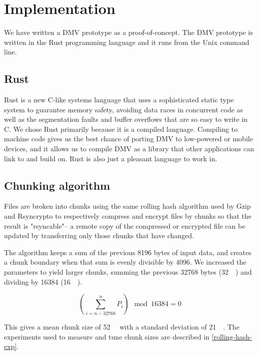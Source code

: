 \chapter{Implementation}

We have written a DMV prototype as a proof-of-concept. The DMV prototype is
written in the Rust programming language and it runs from the Unix command line.


\section{Rust}

Rust is a new C-like systems language that uses a sophisticated static type
system to guarantee memory safety, avoiding data races in concurrent code as
well as the segmentation faults and buffer overflows that are so easy to write
in C. We chose Rust primarily because it is a compiled language. Compiling to
machine code gives us the best chance of porting DMV to low-powered or mobile
devices, and it allows us to compile DMV as a library that other applications
can link to and build on. Rust is also just a pleasant language to work in.





\section{Chunking algorithm}

Files are broken into chunks using the same rolling hash algorithm used by Gzip
and Rsyncrypto\cite{rsyncrypto_algorithm} to respectively compress and encrypt
files by chunks so that the result is "rsyncable"-- a remote copy of the
compressed or encrypted file can be updated by transferring only those chunks
that have changed.

The algorithm keeps a sum of the previous \num{8196} bytes of input data, and
creates a chunk boundary when that sum is evenly divisible by \num{4096}. We
increased the parameters to yield larger chunks, summing the previous
\num{32768} bytes (\SI{32}{\kibi\byte}) and dividing by \num{16384}
(\SI{16}{\kibi\relax}).

\begin{equation*}
    \left( \sum_{i = n - \num{32768} }^{n}{P_i} \right) \mod \num{16384} = 0
\end{equation*}

This gives a mean chunk size of \SI{52}{\kibi\byte} with a standard deviation of
\SI{21}{\kibi\byte}. The experiments used to measure and tune chunk sizes are
described in \autoref{rolling-hash-exp}.




